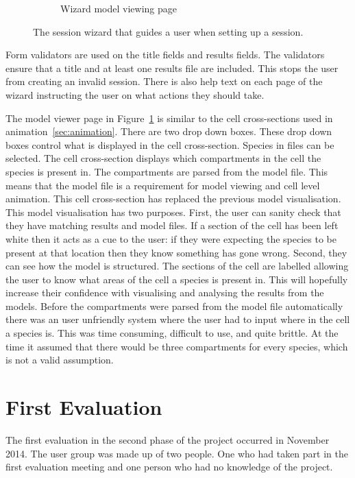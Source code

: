 \begin{figure}[h!]
\begin{subfigure}[b]{0.24\textwidth}
        \caption{Wizard model viewing page}
        \label{fig:page_4}
    \end{subfigure}
    \caption{The session wizard that guides a user when setting up a session.}
    \label{fig:session_wizard}
\end{figure}

Form validators are used on the title fields and results fields.  The validators ensure that a title and at least one results file are included.  This stops the user from creating an invalid session.  There is also help text on each page of the wizard instructing the user on what actions they should take.

The model viewer page in Figure~\ref{fig:page_4} is similar to the cell cross-sections used in animation~\ref{sec:animation}.  There are two drop down boxes.  These drop down boxes control what is displayed in the cell cross-section.  Species in files can be selected.  The cell cross-section displays which compartments in the cell the species is present in.  The compartments are parsed from the model file.  This means that the model file is a requirement for model viewing and cell level animation.  This cell cross-section has replaced the previous model visualisation.  This model visualisation has two purposes. First, the user can sanity check that they have matching results and model files.  If a section of the cell has been left white then it acts as a cue to the user: if they were expecting the species to be present at that location then they know something has gone wrong.  Second, they can see how the model is structured.  The sections of the cell are labelled allowing the user to know what areas of the cell a species is present in.  This will hopefully increase their confidence with visualising and analysing the results from the models. Before the compartments were parsed from the model file automatically there was an user unfriendly system where the user had to input where in the cell a species is.  This was time consuming, difficult to use, and quite brittle.  At the time it assumed that there would be three compartments for every species, which is not a valid assumption.

\section{First Evaluation}

The first evaluation in the second phase of the project occurred in November 2014.  The user group was made up of two people.  One who had taken part in the first evaluation meeting and one person who had no knowledge of the project.

